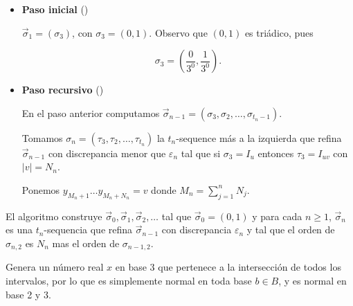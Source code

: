 \documentclass{article}
\theoremstyle{definition} %
\newcommand{\sigmatsequence}{\overset{\rightarrow}{\sigma}}
\begin{document}
\begin{itemize}
    \item[] \textbf{Paso inicial} ()
        
        $\sigmatsequence_1 = (\sigma_3)$, con $\sigma_3 = (0, 1)$. Observo que $(0, 1)$ es triádico, pues

        \[
            \sigma_3 = \left( \frac{0}{3^0}, \frac{1}{3^0} \right).
        \]

    \item[] \textbf{Paso recursivo} ()
    
        En el paso anterior computamos 
        $\sigmatsequence_{n-1} = (\sigma_3, \sigma_2, \dots, \sigma_{t_n - 1})$.

        Tomamos $\sigma_n = (\tau_3, \tau_2, \dots, \tau_{t_n})$ la
        $t_n$-sequence más a la izquierda que refina $\sigmatsequence_{n-1}$ con
        discrepancia menor que $\varepsilon_n$ tal que si $\sigma_3 = I_u$
        entonces $\tau_3 = I_{uv}$ con $|v| = N_n$.

        Ponemos $y_{M_n + 1}\dots y_{M_n + N_n} = v$ donde $M_n = \sum_{j =
        1}^{n} N_j$.
\end{itemize}

El algoritmo construye $\sigmatsequence_0, \sigmatsequence_1, \sigmatsequence_2,
\dots$ tal que $\sigmatsequence_0 = (0, 1)$ y para cada $n \geq 1$,
$\sigmatsequence_n$ es una $t_n$-sequencia que refina $\sigmatsequence_{n-1}$
con discrepancia $\varepsilon_n$ y tal que el orden de $\sigma_{n, 2}$ es $N_n$
mas el orden de $\sigma_{n-1, 2}$.

Genera un número real $x$ en base 3 que pertenece a la intersección de todos los
intervalos, por lo que es simplemente normal en toda base $b \in B$, y es normal
en base 2 y 3.
\end{document}

